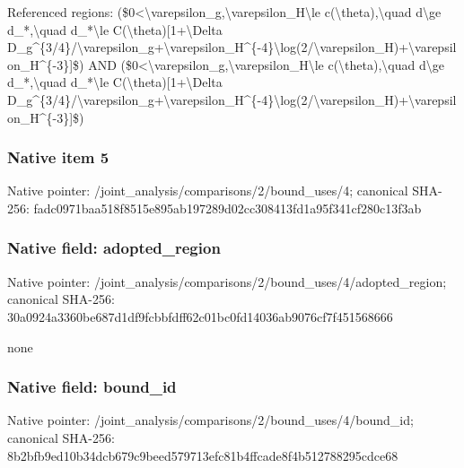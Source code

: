 \documentclass[10pt,a4paper]{article}
\begin{document}
\begingroup\raggedright\sloppy Referenced regions:\allowbreak{} (\$0<\textbackslash{}varepsilon\_\allowbreak{}g,\allowbreak{}\textbackslash{}varepsilon\_\allowbreak{}H\textbackslash{}le c(\textbackslash{}theta),\allowbreak{}\textbackslash{}quad d\textbackslash{}ge d\_\allowbreak{}*,\allowbreak{}\textbackslash{}quad d\_\allowbreak{}*\textbackslash{}le C(\textbackslash{}theta)[1+\textbackslash{}Delta D\_\allowbreak{}g\textasciicircum{}\{3/\allowbreak{}4\}/\allowbreak{}\textbackslash{}varepsilon\_\allowbreak{}g+\textbackslash{}varepsilon\_\allowbreak{}H\textasciicircum{}\{-4\}\textbackslash{}log(2/\allowbreak{}\textbackslash{}varepsilon\_\allowbreak{}H)+\textbackslash{}varepsilon\_\allowbreak{}H\textasciicircum{}\{-3\}]\$) AND (\$0<\textbackslash{}varepsilon\_\allowbreak{}g,\allowbreak{}\textbackslash{}varepsilon\_\allowbreak{}H\textbackslash{}le c(\textbackslash{}theta),\allowbreak{}\textbackslash{}quad d\textbackslash{}ge d\_\allowbreak{}*,\allowbreak{}\textbackslash{}quad d\_\allowbreak{}*\textbackslash{}le C(\textbackslash{}theta)[1+\textbackslash{}Delta D\_\allowbreak{}g\textasciicircum{}\{3/\allowbreak{}4\}/\allowbreak{}\textbackslash{}varepsilon\_\allowbreak{}g+\textbackslash{}varepsilon\_\allowbreak{}H\textasciicircum{}\{-4\}\textbackslash{}log(2/\allowbreak{}\textbackslash{}varepsilon\_\allowbreak{}H)+\textbackslash{}varepsilon\_\allowbreak{}H\textasciicircum{}\{-3\}]\$)\par\endgroup

\subsubsection{Native item 5}
Native pointer: /joint\_\allowbreak{}analysis/comparisons/2/bound\_\allowbreak{}uses/4; canonical SHA-256: fadc0971baa518f8515e895ab197289d02cc308413fd1a95f341cf280c13f3ab

\subsubsection{Native field: adopted\_\allowbreak{}region}
Native pointer: /joint\_\allowbreak{}analysis/comparisons/2/bound\_\allowbreak{}uses/4/adopted\_\allowbreak{}region; canonical SHA-256: 30a0924a3360be687d1df9fcbbfdff62c01bc0fd14036ab9076cf7f451568666

\begingroup\raggedright\sloppy none\par\endgroup

\subsubsection{Native field: bound\_\allowbreak{}id}
Native pointer: /joint\_\allowbreak{}analysis/comparisons/2/bound\_\allowbreak{}uses/4/bound\_\allowbreak{}id; canonical SHA-256: 8b2bfb9ed10b34dcb679c9beed579713efc81b4ffcade8f4b512788295cdce68
\end{document}
